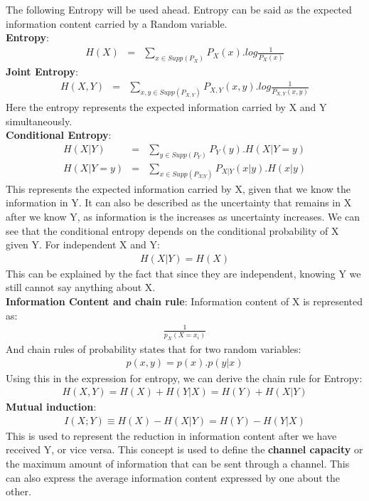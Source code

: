 \documentclass[10pt,twocolumn,letterpaper]{article}
\begin{document}
The following Entropy will be used ahead. Entropy can be said as the expected information content carried by a Random variable.\\
\textbf{Entropy}:
\begin{eqnarray*}
H(X)&=&\sum_{x\in Supp(P_{X})}{P_{X}(x).log\frac{1}{P_{X}(x)}}
\end{eqnarray*}
\textbf{Joint Entropy}:
\begin{eqnarray*}
H(X,Y)&=&\sum_{x,y\in Supp(P_{X,Y})}{P_{X,Y}(x,y).log\frac{1}{P_{X,Y}(x,y)}}
\end{eqnarray*}
Here the entropy represents the expected information carried by X and Y simultaneously.\\
\textbf{Conditional Entropy}:
\begin{eqnarray*}
H(X \vert Y)&=&\sum_{y\in Supp(P_{Y})}{P_{Y}(y).H(X \vert Y=y)}\\
H(X|Y=y)&=&\sum_{x\in Supp(P_{X|Y})}{P_{X|Y}(x|y).H(x|y)}
\end{eqnarray*}
This represents the expected information carried by X, given that we know the information in Y.
It can also be described as the uncertainty that remains in X after we know Y, as information is the increases as uncertainty increases. We can see that the conditional entropy depends on the conditional probability of X given Y.
For independent X and Y:
\begin{eqnarray*}
H(X|Y)=H(X)
\end{eqnarray*}
This can be explained by the fact that since they are independent, knowing Y we still cannot say anything about X.\\
\textbf{Information Content and chain rule}:
Information content of X is represented as:
\begin{eqnarray*}
    \frac{1}{p_X(X=x_i)}
\end{eqnarray*}
And chain rules of probability states that for two random variables:
\begin{eqnarray*}
    p(x,y)=p(x).p(y|x)
\end{eqnarray*}
Using this in the expression for entropy, we can derive the chain rule for Entropy:
\begin{eqnarray*}
    H(X,Y)=H(X)+H(Y|X)=H(Y)+H(X|Y)
\end{eqnarray*}
\textbf{Mutual induction}:
\begin{eqnarray*}
I(X;Y)\equiv H(X)-H(X|Y)=H(Y)-H(Y|X) 
\end{eqnarray*}
This is used to represent the reduction in information content after we have received Y, or vice versa. This concept is used to define the \textbf{channel capacity} or the maximum amount of information that can be sent through a channel. This can also express the average information content expressed by one about the other. 
\end{document}
